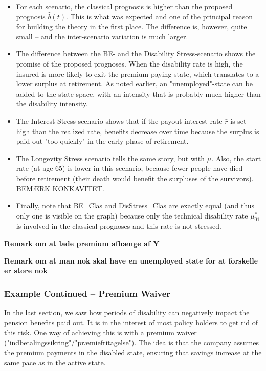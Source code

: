 \documentclass{article}
\newcommand{\1}[1]{\mathbbm{1}_{\left\lbrace #1 \right\rbrace}}
\theoremstyle{break}
\theoremstyle{remark}
\numberwithin{equation}{section}
\begin{document}
\begin{itemize}
	\item For each scenario, the classical prognosis is higher than the proposed prognosis $\hat{b}(t)$. This is what was expected and one of the principal reason for building the theory in the first place. The difference is, however, quite small -- and the inter-scenario variation is much larger.
	\item The difference between the BE- and the Disability Stress-scenario shows the promise of the proposed prognoses. When the disability rate is high, the insured is more likely to exit the premium paying state, which translates to a lower surplus at retirement. As noted earlier, an "unemployed"-state can be added to the state space, with an intensity that is probably much higher than the disability intensity.
	\item The Interest Stress scenario shows that if the payout interest rate $\bar{r}$ is set high than the realized rate, benefits decrease over time because the surplus is paid out "too quickly" in the early phase of retirement.
	\item The Longevity Stress scenario tells the same story, but with $\bar{\mu}$. Also, the start rate (at age 65) is lower in this scenario, because fewer people have died before retirement (their death would benefit the surpluses of the survivors). BEMÆRK KONKAVITET.
	\item Finally, note that BE\_Clas and DisStress\_Clas are exactly equal (and thus only one is visible on the graph) because only the technical disability rate $\mu_{01}^*$ is involved in the classical prognoses and this rate is not stressed.
\end{itemize}



\textbf{Remark om at lade premium afhænge af Y}

\textbf{Remark om at man nok skal have en unemployed state for at forskelle er store nok}

\subsubsection{Example Continued -- Premium Waiver} \label{Waiver}

In the last section, we saw how periods of disability can negatively impact the pension benefits paid out. It is in the interest of most policy holders to get rid of this risk. One way of achieving this is with a premium waiver ("indbetalingssikring"/"præmiefritagelse"). The idea is that the company assumes the premium payments in the disabled state, ensuring that savings increase at the same pace as in the active state.
\end{document}
